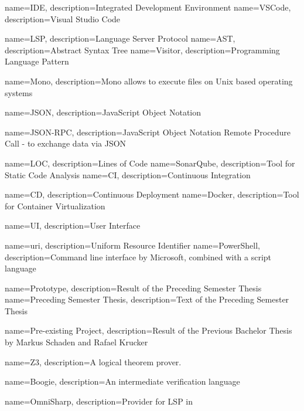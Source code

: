 {
	name=IDE,
	description={Integrated Development Environment}
}
{
	name=VSCode,
	description={Visual Studio Code}
}

{
	name=LSP,
	description={Language Server Protocol}
}
{
	name=AST,
	description={Abstract Syntax Tree}
}
{
	name=Visitor,
	description={Programming Language Pattern}
}

{
	name=Mono,
	description={Mono allows to execute  files on Unix based operating systems}
}

{
	name=JSON,
	description={JavaScript Object Notation}
}

{
	name=JSON-RPC,
	description={JavaScript Object Notation Remote Procedure Call - to exchange data via JSON}
}

{
	name=LOC,
	description={Lines of Code}
}
{
	name=SonarQube,
	description={Tool for Static Code Analysis}
}
{
	name=CI,
	description={Continuous Integration}
}

{
	name=CD,
	description={Continuous Deployment}
}
{
	name=Docker,
	description={Tool for Container Virtualization}
}

{
	name=UI,
	description={User Interface}
}

{
	name=uri,
	description={Uniform Resource Identifier}
}
{
	name=PowerShell,
	description={Command line interface by Microsoft, combined with a script language}
}

{
	name=Prototype,
	description={Result of the Preceding Semester Thesis}
}
{
	name=Preceding Semester Thesis,
	description={Text of the Preceding Semester Thesis}
}

{
	name=Pre-existing Project,
	description={Result of the Previous Bachelor Thesis by Markus Schaden and Rafael Krucker}
}

{
	name=Z3,
	description={A logical theorem prover.}
}

{
	name=Boogie,
	description={An intermediate verification language}
}

{
	name=OmniSharp,
	description={Provider for LSP in \Csharp}
}



